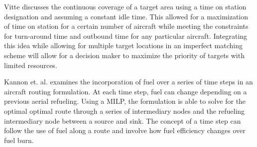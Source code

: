 Vitte \cite{OptimizeBreguet} discusses the continuous coverage of a target area using a time on station designation and assuming a constant idle time. This allowed for a maximization of time on station for a certain number of aircraft while meeting the constraints for turn-around time and outbound time for any particular aircraft. Integrating this idea while allowing for multiple target locations in an imperfect matching scheme will allow for a decision maker to maximize the priority of targets with limited resources.\par
Kannon et. al. \cite{Kannon} examines the incorporation of fuel over a series of time steps in an aircraft routing formulation. At each time step, fuel can change depending on a previous aerial refueling. Using a MILP, the formulation is able to solve for the optimal optimal route through a series of intermediary nodes and the refueling intermediary node between a source and sink. The concept of a time step can follow the use of fuel along a route and involve how fuel efficiency changes over fuel burn.

